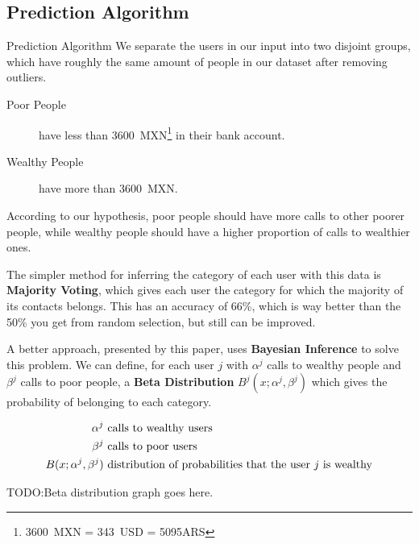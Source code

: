 \documentclass{beamer}
\newcommand{\Beta}{B}
\begin{document}
\subsection{Prediction Algorithm}
\begin{frame}{Prediction Algorithm}
	We separate the users in our input into two disjoint groups, which have roughly the same amount of people in our dataset after removing outliers.

	\begin{description}
		\item[Poor People] have less than 3600~MXN\footnote{3600~MXN = 343~USD = 5095ARS} in their bank account.
		\item[Wealthy People] have more than 3600~MXN.\@
	\end{description}

	According to our hypothesis, poor people should have more calls to other poorer people, while wealthy people should have a higher proportion of calls to wealthier ones.
\end{frame}

\begin{frame}
	The simpler method for inferring the category of each user with this data is \textbf{Majority Voting}, which gives each user the category for which the majority of its contacts belongs. This has an accuracy of 66\%, which is way better than the 50\% you get from random selection, but still can be improved.
\end{frame}

\begin{frame}
	A better approach, presented by this paper, uses \textbf{Bayesian Inference} to solve this problem. We can define, for each user \( j \) with \( \alpha^j \) calls to wealthy people and \( \beta^j \) calls to poor people, a \textbf{Beta Distribution} \( \Beta^j ( x; \alpha^j, \beta^j ) \) which gives the probability of belonging to each category.

	\pause{}

	\[
	\begin{split}
		\alpha^j &\text{ calls to wealthy users} \\
		\beta^j  &\text{ calls to poor users} \\
		\Beta(x; \alpha^j, \beta^j) &\text{ distribution of probabilities that the user \( j \) is wealthy}
	\end{split}
	\]

	TODO:\@ Beta distribution graph goes here.
\end{frame}
\end{document}
